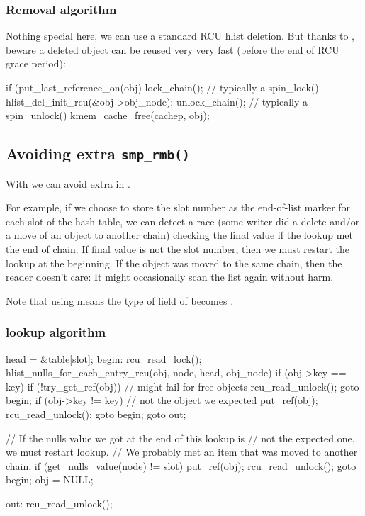 \subsubsection{Removal algorithm}

Nothing special here, we can use a standard RCU hlist deletion.
But thanks to , beware a deleted object can be reused
very very fast (before the end of RCU grace period):

\begin{VerbatimU}
	if (put_last_reference_on(obj) {
		lock_chain(); // typically a spin_lock()
		hlist_del_init_rcu(&obj->obj_node);
		unlock_chain(); // typically a spin_unlock()
		kmem_cache_free(cachep, obj);
	}
\end{VerbatimU}


\subsection{Avoiding extra \texttt{smp\_rmb()}}

With  we can avoid extra  in .

For example, if we choose to store the slot number as the 
end-of-list marker for each slot of the hash table, we can detect
a race (some writer did a delete and/or a move of an object
to another chain) checking the final  value if
the lookup met the end of chain.
If final  value
is not the slot number, then we must restart the lookup at
the beginning.
If the object was moved to the same chain,
then the reader doesn't care:
It might occasionally
scan the list again without harm.

Note that using  means the type of  field of
 becomes .


\subsubsection{lookup algorithm}

\begin{VerbatimU}
	head = &table[slot];
	begin:
	rcu_read_lock();
	hlist_nulls_for_each_entry_rcu(obj, node, head, obj_node) {
		if (obj->key == key) {
			if (!try_get_ref(obj)) { // might fail for free objects
				rcu_read_unlock();
				goto begin;
			}
			if (obj->key != key) { // not the object we expected
				put_ref(obj);
				rcu_read_unlock();
				goto begin;
			}
			goto out;
		}
	}

	// If the nulls value we got at the end of this lookup is
	// not the expected one, we must restart lookup.
	// We probably met an item that was moved to another chain.
	if (get_nulls_value(node) != slot) {
		put_ref(obj);
		rcu_read_unlock();
		goto begin;
	}
	obj = NULL;

	out:
	rcu_read_unlock();
\end{VerbatimU}

